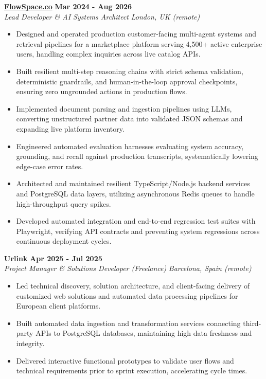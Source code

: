 \documentclass[10pt,a4paper]{article}
\newcommand{\role}[4]{%
  \textbf{#1} \hfill \textbf{#2}\\[1pt]%
  \textit{#3} \hfill \textit{#4}\\[2pt]%
}
\begin{document}
\role{\href{https://flowspace.co}{FlowSpace.co}}{Mar 2024 - Aug 2026}{Lead Developer \& AI Systems Architect}{London, UK (remote)}
\begin{itemize}
  \item Designed and operated production customer-facing multi-agent systems and retrieval pipelines for a marketplace platform serving 4,500+ active enterprise users, handling complex inquiries across live catalog APIs.
  \item Built resilient multi-step reasoning chains with strict schema validation, deterministic guardrails, and human-in-the-loop approval checkpoints, ensuring zero ungrounded actions in production flows.
  \item Implemented document parsing and ingestion pipelines using LLMs, converting unstructured partner data into validated JSON schemas and expanding live platform inventory.
  \item Engineered automated evaluation harnesses evaluating system accuracy, grounding, and recall against production transcripts, systematically lowering edge-case error rates.
  \item Architected and maintained resilient TypeScript/Node.js backend services and PostgreSQL data layers, utilizing asynchronous Redis queues to handle high-throughput query spikes.
  \item Developed automated integration and end-to-end regression test suites with Playwright, verifying API contracts and preventing system regressions across continuous deployment cycles.
\end{itemize}

\role{Urlink}{Apr 2025 - Jul 2025}{Project Manager \& Solutions Developer (Freelance)}{Barcelona, Spain (remote)}
\begin{itemize}
  \item Led technical discovery, solution architecture, and client-facing delivery of customized web solutions and automated data processing pipelines for European client platforms.
  \item Built automated data ingestion and transformation services connecting third-party APIs to PostgreSQL databases, maintaining high data freshness and integrity.
  \item Delivered interactive functional prototypes to validate user flows and technical requirements prior to sprint execution, accelerating cycle times.
\end{itemize}
\end{document}
